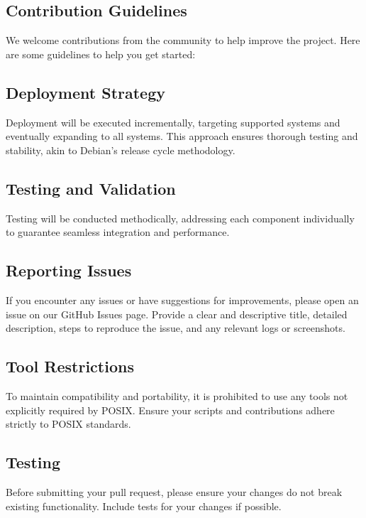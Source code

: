 \subsection{Contribution Guidelines}
\label{sec:introduction:sub:guidelines}
We welcome contributions from the community to help improve the project. Here are some guidelines to help you get started:

\subsection{Deployment Strategy}
\label{sec:introduction:sub:deployment}
Deployment will be executed incrementally, targeting supported systems and eventually expanding to all systems. This approach ensures thorough testing and stability, akin to Debian's release cycle methodology.

\subsection{Testing and Validation}
\label{sec:introduction:sub:valid}
Testing will be conducted methodically, addressing each component individually to guarantee seamless integration and performance.

\subsection{Reporting Issues}
\label{sec:introduction:sub:report}
If you encounter any issues or have suggestions for improvements, please open an issue on our GitHub Issues page.
Provide a clear and descriptive title, detailed description, steps to reproduce the issue, and any relevant logs or screenshots.

\subsection{Tool Restrictions}
\label{sec:introduction:sub:restrict}
To maintain compatibility and portability, it is prohibited to use any tools not explicitly required by POSIX.
Ensure your scripts and contributions adhere strictly to POSIX standards.

\subsection{Testing}
\label{sec:introduction:sub:test}
Before submitting your pull request, please ensure your changes do not break existing functionality.
Include tests for your changes if possible.


